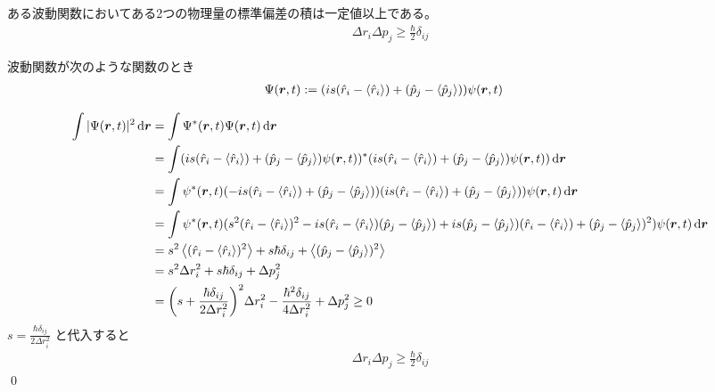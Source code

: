 \documentclass[uplatex,dvipdfmx,a4paper,11pt]{jlreq}
\makeatletter
\newcommand{\rr}{\bm{r}}
\theoremstyle{definition}
\renewenvironment{proof}[1][\proofname]{\par
  \normalfont
  \topsep6\p@\@plus6\p@ \trivlist
  \item[\hskip\labelsep{\bfseries #1}\@addpunct{\bfseries}]\ignorespaces\quad\par
}{%
  \qed\endtrivlist\@endpefalse
}
\renewcommand\proofname{証明}
\makeatother
\begin{document}
\begin{theorem}[不確定性原理]
  ある波動関数においてある2つの物理量の標準偏差の積は一定値以上である。
  \begin{align}
    \Delta r_i\Delta p_j \geq \frac{\hbar}{2}\delta_{ij}
  \end{align}
\end{theorem}
\begin{proof}
  波動関数が次のような関数のとき
  \begin{align}
    \Psi(\rr, t) & := (is(\hat{r}_i - \ev{\hat{r}_i}) + (\hat{p}_j - \ev{\hat{p}_j}))\psi(\rr, t)
  \end{align}

  \begin{align}
    \int|\Psi(\rr, t)|^2\dd{\rr} & = \int\Psi^*(\rr, t)\Psi(\rr, t)\dd{\rr}                                                                                                                                                                                               \\
                                 & = \int(is(\hat{r}_i - \ev{\hat{r}_i}) + (\hat{p}_j - \ev{\hat{p}_j})\psi(\rr, t))^*(is(\hat{r}_i - \ev{\hat{r}_i}) + (\hat{p}_j - \ev{\hat{p}_j})\psi(\rr, t))\dd{\rr}                                                                 \\
                                 & = \int\psi^*(\rr, t)(-is(\hat{r}_i - \ev{\hat{r}_i}) + (\hat{p}_j - \ev{\hat{p}_j}))(is(\hat{r}_i - \ev{\hat{r}_i}) + (\hat{p}_j - \ev{\hat{p}_j}))\psi(\rr, t)\dd{\rr}                                                                \\
                                 & = \int\psi^*(\rr, t)(s^2(\hat{r}_i - \ev{\hat{r}_i})^2 - is(\hat{r}_i - \ev{\hat{r}_i})(\hat{p}_j - \ev{\hat{p}_j}) + is(\hat{p}_j - \ev{\hat{p}_j})(\hat{r}_i - \ev{\hat{r}_i}) + (\hat{p}_j - \ev{\hat{p}_j})^2)\psi(\rr, t)\dd{\rr} \\
                                 & = s^2\ev{(\hat{r}_i - \ev{\hat{r}_i})^2} + s\hbar\delta_{ij} + \ev{(\hat{p}_j - \ev{\hat{p}_j})^2}                                                                                                                                     \\
                                 & = s^2\Delta r_i^2 + s\hbar\delta_{ij} + \Delta p_j^2                                                                                                                                                                                   \\
                                 & = \qty(s + \frac{\hbar\delta_{ij}}{2\Delta r_i^2})^2\Delta r_i^2 - \frac{\hbar^2\delta_{ij}}{4\Delta r_i^2} + \Delta p_j^2 \geq 0                                                                                                      \\
  \end{align}
  $s = \frac{\hbar\delta_{ij}}{2\Delta r_i^2}$ と代入すると
  \begin{align}
    \Delta r_i\Delta p_j \geq \frac{\hbar}{2}\delta_{ij}
  \end{align}
\end{proof}
\end{document}
